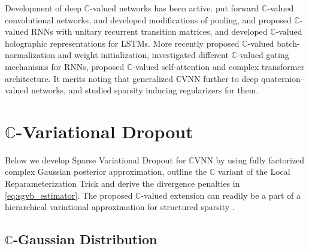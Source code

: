\documentclass[a4paper,10pt,twocolumn]{article}
\newcommand{\cplx}{\mathbb{C}}
\newcommand{\important}[1]{\textbf{\!\colorbox{red}{#1}\!}}
\newcommand{\todo}[1]{{\color{blue} [TODO]} \important{#1}}
\begin{document}
Development of deep $\cplx$-valued networks has been active. \citet{haensch_complex-valued_2010}
put forward $\cplx$-valued convolutional networks, \citet{guberman_complex_2016} and
\citet{popa_complex-valued_2017} developed modifications of pooling, \citet{arjovsky_unitary_2016}
and \citet{wisdom_full-capacity_2016} proposed $\cplx$-valued RNNs with unitary recurrent
transition matrices, and \citet{danihelka_associative_2016} developed $\cplx$-valued
holographic representations for LSTMs. More recently \citet{trabelsi_deep_2018} proposed
$\cplx$-valued batch-normalization and weight initialization, \citet{wolter_complex_2018}
investigated different $\cplx$-valued gating mechanisms for RNNs, \citet{yang_complex_2019}
proposed $\cplx$-valued self-attention and complex transformer architecture. It merits
noting that \citet{gaudet_deep_2018} generalized $\cplx$VNN further to deep quaternion-valued
networks, and \citet{vecchi_compressing_2020} studied sparsity inducing regularizers for
them.





\section{$\cplx$-Variational Dropout} %
\label{sec:c_variational_dropout}

Below we develop Sparse Variational Dropout for $\cplx$VNN by using fully factorized
complex Gaussian posterior approximation, outline the $\cplx$ variant of the Local
Reparameterization Trick and derive the divergence penalties in \eqref{eq:sgvb_estimator}.
The proposed $\cplx$-valued extension can readily be a part of a hierarchical variational
approximation for structured sparsity \citep{louizos_bayesian_2017}.

\subsection{$\cplx$-Gaussian Distribution} %
\label{sub:c_gauss_and_local_rep}
\end{document}
